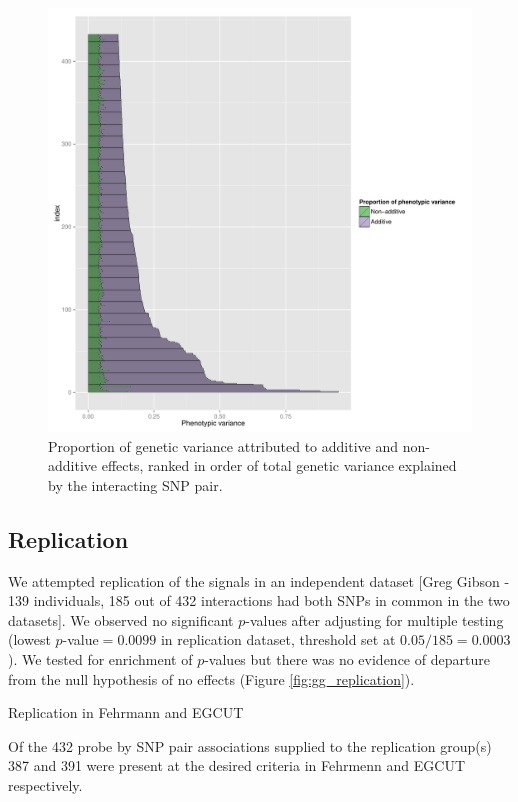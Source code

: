 \documentclass[paper=a4, fontsize=11pt]{scrartcl}	%
\numberwithin{equation}{section}									%
\numberwithin{figure}{section}										%
\numberwithin{table}{section}										%
\begin{document}
\begin{figure}[p]
	\centering
	\includegraphics[width=15cm]{images/proportion_additive}
	\caption{Proportion of genetic variance attributed to additive and non-additive effects, ranked in order of total genetic variance explained by the interacting SNP pair.}
	\label{fig:proportion_additive}
\end{figure}



\subsection{Replication}


We attempted replication of the signals in an independent dataset [Greg Gibson - 139 individuals, 185 out of 432 interactions had both SNPs in common in the two datasets]. We observed no significant $p$-values after adjusting for multiple testing (lowest $p$-value$=0.0099$ in replication dataset, threshold set at $0.05/185=0.0003$). We tested for enrichment of $p$-values but there was no evidence of departure from the null hypothesis of no effects (Figure \ref{fig:gg_replication}). 

Replication in Fehrmann and EGCUT

Of the 432 probe by SNP pair associations supplied to the replication group(s) 387 and 391 were present at the desired criteria in Fehrmenn and EGCUT respectively.
\end{document}
